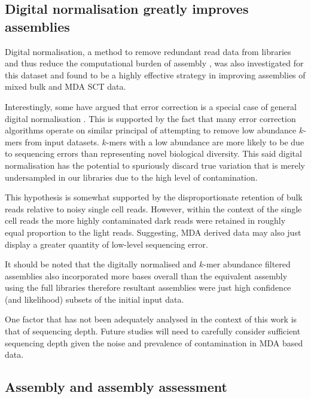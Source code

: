 \subsection{Digital normalisation greatly improves assemblies}

Digital normalisation, a method to remove redundant read data from libraries and thus
reduce the computational burden of assembly \citep{Brown2012}, was also investigated for this dataset
and found to be a highly effective strategy in improving assemblies of mixed bulk and MDA SCT data.

Interestingly, some have argued that error correction is a special case of general digital normalisation
\citep{Krasileva2013}.  This is supported by the fact that many error correction
algorithms operate on similar principal of attempting to remove low abundance \(k\)-mers
from input datasets. \(k\)-mers with a low abundance
are more likely to be due to sequencing errors than representing novel biological
diversity.   
This said digital normalisation has the potential to
spuriously discard true variation that is merely undersampled in our libraries
due to the high level of contamination.  

This hypothesis is somewhat supported by the disproportionate 
retention of bulk reads relative to noisy single cell reads.  However,
within the context of the single cell reads the more highly
contaminated dark reads were retained in roughly equal proportion to the light reads.
Suggesting, MDA derived data may also just display a greater quantity of 
low-level sequencing error.  

It should be noted that the digitally normalised and \(k\)-mer abundance filtered assemblies also
incorporated more bases overall than the equivalent assembly using the full
libraries therefore resultant assemblies were just high confidence (and likelihood)
subsets of the initial input data.

One factor that has not been adequately analysed in the context of this work
is that of sequencing depth.  Future studies will need to carefully consider
sufficient sequencing depth given the noise and prevalence of contamination
in MDA based data.


\subsection{Assembly and assembly assessment}

